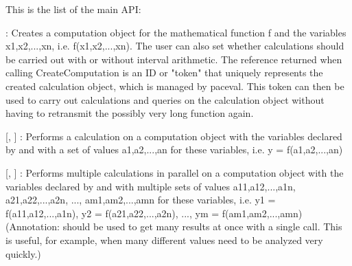 This is the list of the main API\+:
\begin{DoxyItemize}
\item {} \+: Creates a computation object for the mathematical function f and the variables x1,x2,...,xn, i.\+e. f(x1,x2,...,xn). The user can also set whether calculations should be carried out with or without interval arithmetic. The reference returned when calling Create\+Computation is an ID or "{}token"{} that uniquely represents the created calculation object, which is managed by paceval. This token can then be used to carry out calculations and queries on the calculation object without having to retransmit the possibly very long function again.
\item {} \mbox{[}, \mbox{]} \+: Performs a calculation on a computation object with the variables declared by  and with a set of values a1,a2,...,an for these variables, i.\+e. y = f(a1,a2,...,an)
\item {} \mbox{[}, \mbox{]} \+: Performs multiple calculations in parallel on a computation object with the variables declared by  and with multiple sets of values a11,a12,...,a1n, a21,a22,...,a2n, ..., am1,am2,...,amn for these variables, i.\+e. y1 = f(a11,a12,...,a1n), y2 = f(a21,a22,...,a2n), ..., ym = f(am1,am2,...,amn) (Annotation\+:  should be used to get many results at once with a single call. This is useful, for example, when many different values need to be analyzed very quickly.)

\end{DoxyItemize}
